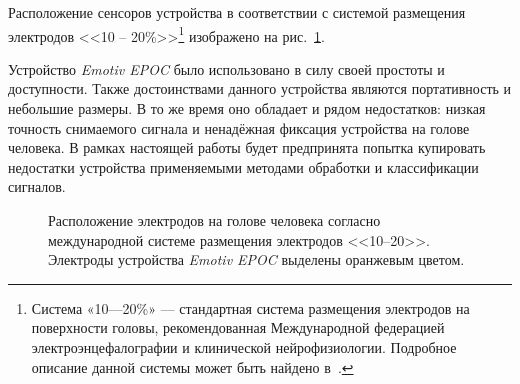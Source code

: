 \documentclass[12pt,a4paper,oneside,fleqn,leqno]{article}
\begin{document}
	\par Расположение сенсоров устройства в соответствии с системой размещения электродов <<10 -- 20\%>>\footnote{Система «10—20\%» — стандартная система размещения электродов на поверхности головы, рекомендованная Международной федерацией электроэнцефалографии и клинической нейрофизиологии. Подробное описание данной системы может быть найдено в~\cite{system10-20}.} изображено на рис.~\ref{electrode_map}.

	\par Устройство {\it Emotiv EPOC} было использовано в силу своей простоты и доступности. Также достоинствами данного устройства являются портативность и небольшие размеры. В то же время оно обладает и рядом недостатков: низкая точность снимаемого сигнала и ненадёжная фиксация устройства на голове человека. В рамках настоящей работы будет предпринята попытка купировать недостатки устройства применяемыми методами обработки и классификации сигналов.

	\begin{figure}[h!]
		\caption{Расположение электродов на голове человека согласно международной системе размещения электродов <<10--20>>. Электроды устройства {\it Emotiv EPOC} выделены оранжевым цветом.}
	\label{electrode_map}
	\end{figure}
\end{document}
